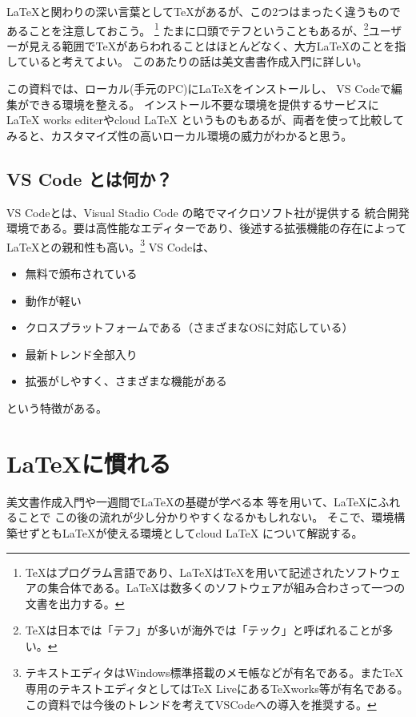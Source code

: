 \documentclass[titlepage]{ltjsarticle}
\begin{document}
\LaTeX と関わりの深い言葉として\TeX があるが、この2つはまったく違うものであることを注意しておこう。
\footnote{\TeX \index{\TeX}はプログラム言語であり、\LaTeX は\TeX を用いて記述されたソフトウェアの集合体である。\LaTeX は数多くのソフトウェアが組み合わさって一つの文書を出力する。}
たまに口頭でテフということもあるが、\footnote{\TeX は日本では「テフ」が多いが海外では「テック」と呼ばれることが多い。}ユーザーが見える範囲で\TeX があらわれることはほとんどなく、大方\LaTeX のことを指していると考えてよい。
このあたりの話は美文書書作成入門\cite{美文書本}に詳しい。

この資料では、ローカル(手元のPC)に\LaTeX をインストールし、
VS Codeで編集ができる環境を整える。
インストール不要な環境を提供するサービスにLaTeX works editerやcloud LaTeX というものもあるが、両者を使って比較してみると、カスタマイズ性の高いローカル環境の威力がわかると思う。

\subsection{VS Code とは何か？}
VS Codeとは、Visual Stadio Code の略でマイクロソフト社が提供する
統合開発環境である。要は高性能なエディターであり、後述する拡張機能の存在によって\LaTeX との親和性も高い。\footnote{テキストエディタはWindows標準搭載のメモ帳などが有名である。またTeX専用のテキストエディタとしてはTeX LiveにあるTeXworks等が有名である。この資料では今後のトレンドを考えてVSCodeへの導入を推奨する。}
VS Codeは、
\begin{itemize}
  \item 無料で頒布されている
  \item 動作が軽い
  \item クロスプラットフォームである（さまざまなOSに対応している）
  \item 最新トレンド全部入り
  \item 拡張がしやすく、さまざまな機能がある
\end{itemize}
という特徴がある。

\section{\LaTeX に慣れる}
美文書作成入門\cite{美文書本}や一週間で\LaTeX の基礎が学べる本
\cite{一週間基礎}等を用いて、\LaTeX にふれることで
この後の流れが少し分かりやすくなるかもしれない。
そこで、環境構築せずとも\LaTeX が使える環境としてcloud LaTeX
について解説する。
\end{document}
